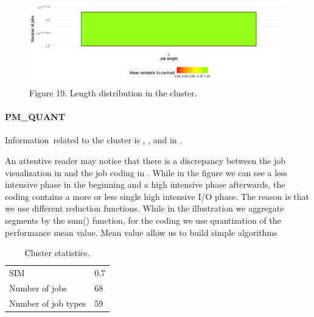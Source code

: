 \documentclass[]{llncs}
\begin{document}
\begin{figure}
  \centering
  \includegraphics[width=4.61in,height=1.39in]{./media/image2.png}
  \caption{Figure 19. Length distribution in the cluster.}
  \label{fig:use_case:hex_native:length}
\end{figure}


\paragraph{PM\_QUANT}
Information\ related to the cluster is , , and in .

An attentive reader may notice that there is a discrepancy between the job visualization in  and the job coding in .
While in the figure we can see a less intensive phase in the beginning and a high intensive phase afterwards, the coding contains a more or less single high intensive I/O phase.
The reason is that we use different reduction functions.
While in the illustration we aggregate segments by the sum() function, for the coding we use quantization of the performance mean value.
Mean value allow us to build simple algorithms

\begin{table}
  \centering
  \begin{tabular}{ll}
    SIM                 & 0.7 \\ 
    Number of jobs      & 68  \\ 
    Number of job types & 59  \\ 
  \end{tabular}
  \caption{Cluster statistics.}
  \label{tab:use_case:pm_quant:stats}
\end{table}
\end{document}
